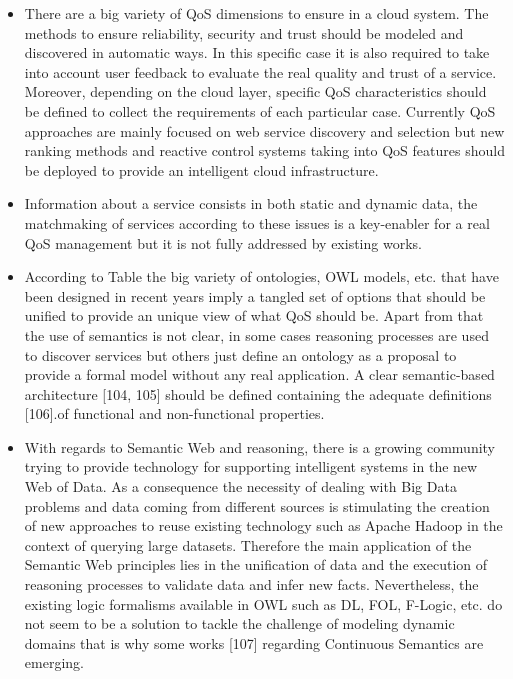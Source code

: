 \begin{itemize}
 \item There are a big variety of QoS dimensions to ensure in a cloud system. 
The methods to ensure reliability, security and trust should be modeled and 
discovered in automatic ways. In this specific case it is also required to take 
into account user feedback to evaluate the real quality and trust of a service. 
Moreover, depending on the cloud layer, specific QoS characteristics should be 
defined to collect the requirements of each particular case. Currently QoS 
approaches are mainly focused on web service discovery and selection but new 
ranking methods and reactive control systems taking into QoS features should be 
deployed to provide an intelligent cloud infrastructure.  

 \item Information about a service consists in both static and dynamic data, the 
matchmaking of services according to these issues is a key-enabler for a real 
QoS management but it is not fully addressed by existing works.

 \item According to Table  the big variety of ontologies, OWL models, etc. that 
have been designed in recent years imply a tangled set of options that should be 
unified to provide an unique view of  what QoS should be. Apart from that the 
use of semantics is not clear, in some cases reasoning processes are used to 
discover services but others just define an ontology as a proposal to provide a 
formal model without any real application. A clear semantic-based architecture 
[104, 105] should be defined containing the adequate definitions [106].of 
functional and non-functional properties.

 \item With regards to Semantic Web and reasoning, there is a growing community 
trying to provide technology for supporting intelligent systems in the new Web 
of Data. As a consequence the necessity of dealing with Big Data problems and 
data coming from different sources is stimulating the creation of new approaches 
to reuse existing technology such as Apache Hadoop in the context of querying 
large datasets. Therefore the main application of the Semantic Web principles 
lies in the unification of data and the execution of reasoning processes to 
validate data and infer new facts. Nevertheless, the existing logic formalisms 
available in OWL such as DL, FOL, F-Logic, etc. do not seem to be a solution to 
tackle the challenge of modeling dynamic domains that is why some works [107] 
regarding Continuous Semantics are emerging.


\end{itemize}
